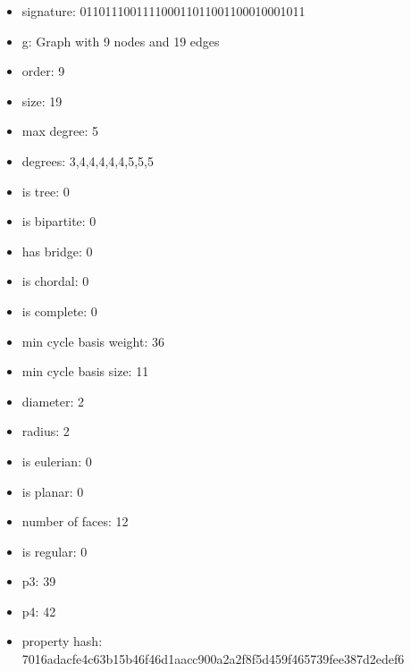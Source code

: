 \newpage
\begin{figure}
\end{figure}
\begin{itemize}
\item signature: 011011100111100011011001100010001011
\item g: Graph with 9 nodes and 19 edges
\item order: 9
\item size: 19
\item max degree: 5
\item degrees: 3,4,4,4,4,4,5,5,5
\item is tree: 0
\item is bipartite: 0
\item has bridge: 0
\item is chordal: 0
\item is complete: 0
\item min cycle basis weight: 36
\item min cycle basis size: 11
\item diameter: 2
\item radius: 2
\item is eulerian: 0
\item is planar: 0
\item number of faces: 12
\item is regular: 0
\item p3: 39
\item p4: 42
\item property hash: 7016adacfe4c63b15b46f46d1aacc900a2a2f8f5d459f465739fee387d2edef6
\end{itemize}
